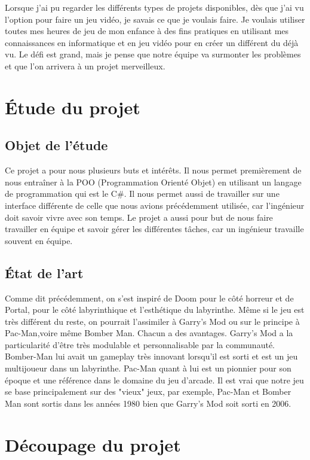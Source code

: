 \documentclass{article}
\begin{document}
Lorsque j’ai pu regarder les différents types de projets disponibles, dès que j’ai vu l’option pour faire un jeu vidéo, je savais ce que je voulais faire. Je voulais utiliser toutes mes heures de jeu de mon enfance à des fins pratiques en utilisant mes connaissances en informatique et en jeu vidéo pour en créer un différent du déjà vu. Le défi est grand, mais je pense que notre équipe va surmonter les problèmes et que l’on arrivera à un projet merveilleux.


\section{Étude du projet}
\subsection{Objet de l’étude}

Ce projet a pour nous plusieurs buts et intérêts. Il nous permet premièrement de nous entraîner à la POO (Programmation Orienté Objet) en utilisant un langage de programmation qui est le C\#. Il nous permet aussi de travailler sur une interface différente de celle que nous avions précédemment utilisée, car l’ingénieur doit savoir vivre avec son temps. Le projet a aussi pour but de nous faire travailler en équipe et savoir gérer les différentes tâches, car un ingénieur travaille souvent en équipe.

\subsection{État de l’art}

Comme dit précédemment, on s’est inspiré de Doom pour le côté horreur et de Portal, pour le côté labyrinthique et l’esthétique du labyrinthe. Même si le jeu est très différent du reste, on pourrait l’assimiler à Garry’s Mod ou sur le principe à Pac-Man,voire même Bomber Man. Chacun a des avantages. Garry’s Mod a la particularité d’être très modulable et personnalisable par la communauté. Bomber-Man lui avait un gameplay très innovant lorsqu'il est sorti et est un jeu multijoueur dans un labyrinthe. Pac-Man quant à lui est un pionnier pour son époque et une référence dans le domaine du jeu d’arcade. Il est vrai que notre jeu se base principalement sur des "vieux" jeux, par exemple, Pac-Man et Bomber Man sont sortis dans les années 1980 bien que Garry's Mod soit sorti en 2006.


\newpage
\section{Découpage du projet}
\end{document}
